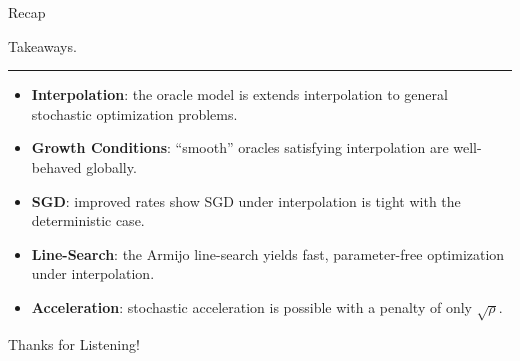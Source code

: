 \documentclass[mathserif,notheorems, hyperref={colorlinks, citecolor=blue, urlcolor=blue, linkcolor=blue}]{beamer}
\begin{document}
    \begin{frame}{Recap}
       \begin{center}
         \vspace{-2ex}
         \Large Takeaways.

         \vspace{-1ex}
         \rule{0.66\textwidth}{1px}
         \vspace{1ex}
       \end{center}

        \begin{itemize}
            \item \textbf{Interpolation}: the oracle model is extends interpolation to general stochastic optimization problems. 
                \vspace{1ex}
            \item \textbf{Growth Conditions}: ``smooth'' oracles satisfying interpolation are well-behaved globally. 
                \vspace{1ex}
            \item \textbf{SGD}: improved rates show SGD under interpolation is tight with the deterministic case. 
                \vspace{1ex}
            \item \textbf{Line-Search}: the Armijo line-search yields fast, parameter-free optimization under interpolation.  
                \vspace{1ex}
            \item \textbf{Acceleration}: stochastic acceleration is possible with a penalty of only \( \sqrt{\rho} \). 
        \end{itemize}
    \end{frame}
    


    \begin{frame}{}
        \begin{center}
        \huge Thanks for Listening!
        \end{center}
    \end{frame}

\end{document}
